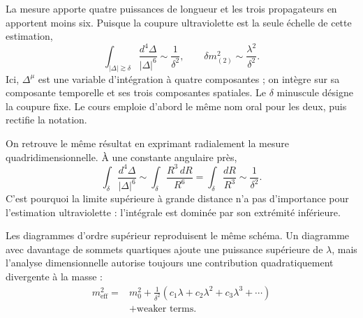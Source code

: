 \begin{classroomqa}
\end{classroomqa}

La mesure apporte quatre puissances de longueur et les trois propagateurs en apportent moins six. Puisque la coupure ultraviolette est la seule échelle de cette estimation,
\begin{equation}
\int_{|\Delta|\gtrsim\delta}
\frac{d^4\Delta}{|\Delta|^6}
\sim\frac{1}{\delta^2},
\qquad
\delta m^2_{(2)}
\sim\frac{\lambda^2}{\delta^2}.
\label{eq:two-loop-scalar-mass}
\end{equation}
Ici, \(\Delta^\mu\) est une variable d’intégration à quatre composantes ; on intègre sur sa composante temporelle et ses trois composantes spatiales. Le \(\delta\) minuscule désigne la coupure fixe. Le cours emploie d’abord le même nom oral pour les deux, puis rectifie la notation.

On retrouve le même résultat en exprimant radialement la mesure quadridimensionnelle. À une constante angulaire près,
\begin{equation}
\int_{\delta}\frac{d^4\Delta}{|\Delta|^6}
\sim
\int_{\delta}\frac{R^3\,dR}{R^6}
=\int_{\delta}\frac{dR}{R^3}
\sim\frac{1}{\delta^2}.
\end{equation}
C’est pourquoi la limite supérieure à grande distance n’a pas d’importance pour l’estimation ultraviolette : l’intégrale est dominée par son extrémité inférieure.

Les diagrammes d’ordre supérieur reproduisent le même schéma. Un diagramme avec davantage de sommets quartiques ajoute une puissance supérieure de \(\lambda\), mais l’analyse dimensionnelle autorise toujours une contribution quadratiquement divergente à la masse :
\begin{equation}
\begin{aligned}
m_{\mathrm{eff}}^2
={}&m_0^2
+\frac{1}{\delta^2}
\left(c_1\lambda+c_2\lambda^2+c_3\lambda^3+\cdots\right)\\
&+\text{weaker terms}.
\end{aligned}
\label{eq:scalar-mass-series}
\end{equation}

